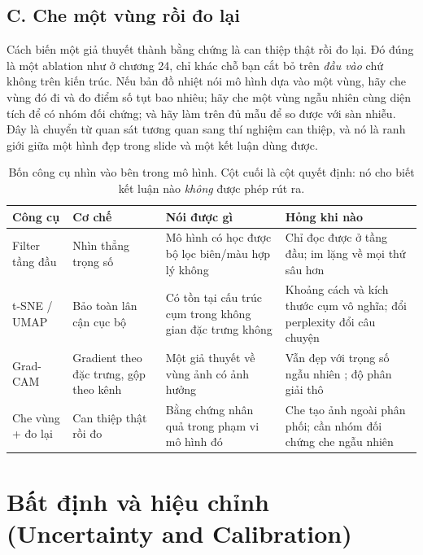 \documentclass[../../deep_learning.tex]{subfiles}
\begin{document}
\subsection{C. Che một vùng rồi đo lại}
Cách biến một giả thuyết thành bằng chứng là can thiệp thật rồi đo lại. Đó đúng là một ablation như ở chương 24, chỉ khác chỗ bạn cắt bỏ trên \emph{đầu vào} chứ không trên kiến trúc. Nếu bản đồ nhiệt nói mô hình dựa vào một vùng, hãy che vùng đó đi và đo điểm số tụt bao nhiêu; hãy che một vùng ngẫu nhiên cùng diện tích để có nhóm đối chứng; và hãy làm trên đủ mẫu để so được với sàn nhiễu. Đây là chuyển từ quan sát tương quan sang thí nghiệm can thiệp, và nó là ranh giới giữa một hình đẹp trong slide và một kết luận dùng được.

\begin{table}[H]\centering\footnotesize
\caption{Bốn công cụ nhìn vào bên trong mô hình. Cột cuối là cột quyết định: nó cho biết kết luận nào \emph{không} được phép rút ra.}
\label{tab:cong-cu-visual}
\begin{tabularx}{\linewidth}{@{}L{2.4cm}YYL{3.4cm}@{}}
\toprule
\textbf{Công cụ} & \textbf{Cơ chế} & \textbf{Nói được gì} & \textbf{Hỏng khi nào}\\
\midrule
Filter tầng đầu & Nhìn thẳng trọng số & Mô hình có học được bộ lọc biên/màu hợp lý không & Chỉ đọc được ở tầng đầu; im lặng về mọi thứ sâu hơn\\
t-SNE / UMAP & Bảo toàn lân cận cục bộ & Có tồn tại cấu trúc cụm trong không gian đặc trưng không & Khoảng cách và kích thước cụm vô nghĩa; đổi perplexity đổi câu chuyện\\
Grad-CAM & Gradient theo đặc trưng, gộp theo kênh & Một giả thuyết về vùng ảnh có ảnh hưởng & Vẫn đẹp với trọng số ngẫu nhiên \cite{adebayo2018sanity}; độ phân giải thô\\
Che vùng + đo lại & Can thiệp thật rồi đo & Bằng chứng nhân quả trong phạm vi mô hình đó & Che tạo ảnh ngoài phân phối; cần nhóm đối chứng che ngẫu nhiên\\
\bottomrule
\end{tabularx}
\end{table}

\section{Bất định và hiệu chỉnh (Uncertainty and Calibration)}
\end{document}
